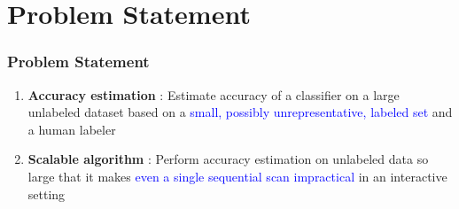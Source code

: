 \documentclass[usenames,dvipsnames, 11pt]{beamer}
\newlength{\wideitemsep}
\let\olditem\item
\renewcommand{\item}{\setlength{\itemsep}{\wideitemsep}\olditem}
\begin{document}
\section{Problem Statement}
\begin{frame}
\frametitle{Problem Statement}
\begin{enumerate}
\item \textbf{Accuracy estimation} : Estimate accuracy of a classifier on a large unlabeled dataset based on a \textcolor{blue}{small, possibly unrepresentative, labeled set} and a human labeler \vspace*{5mm}

\item \textbf{Scalable algorithm} : Perform accuracy estimation on unlabeled data so large that it makes \textcolor{blue}{even a single sequential scan impractical} in an interactive setting
\end{enumerate}
\end{frame}

\end{document}
